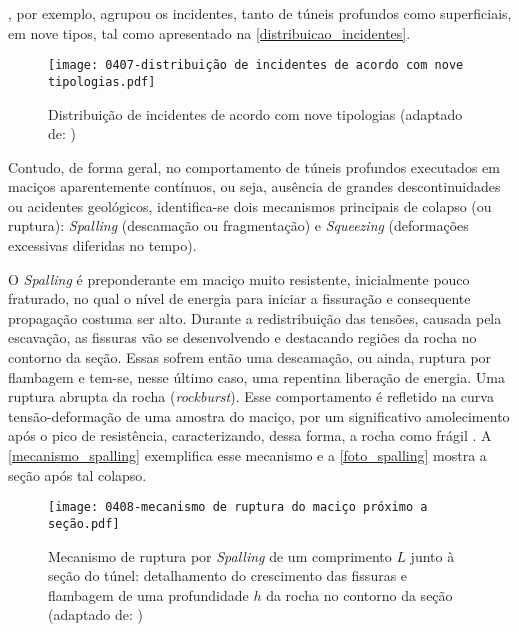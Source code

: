 , por exemplo, agrupou os incidentes, tanto de túneis profundos como superficiais, em nove tipos, tal como apresentado na \autoref{distribuicao_incidentes}.

\begin{figure}[H]
	\begin{center}
		\texttt{[image: 0407-distribuição de incidentes de acordo com nove tipologias.pdf]}
	\end{center}
	\caption{\label{distribuicao_incidentes}Distribuição de incidentes de acordo com nove tipologias (adaptado de: )}
\end{figure}

Contudo, de forma geral, no comportamento de túneis profundos executados em maciços aparentemente contínuos, ou seja, ausência de grandes descontinuidades ou acidentes geológicos, identifica-se dois mecanismos principais de colapso (ou ruptura): \textit{Spalling} (descamação ou fragmentação) e \textit{Squeezing} (deformações excessivas diferidas no tempo).

O \textit{Spalling} é preponderante em maciço muito resistente, inicialmente pouco fraturado, no qual o nível de energia para iniciar a fissuração e consequente propagação costuma ser alto. Durante a redistribuição das tensões, causada pela escavação, as fissuras vão se desenvolvendo e destacando regiões da rocha no contorno da seção. Essas sofrem então uma descamação, ou ainda, ruptura por flambagem e tem-se, nesse último caso, uma repentina liberação de energia. Uma ruptura abrupta da rocha (\textit{rockburst}). Esse comportamento é refletido na curva tensão-deformação de uma amostra do maciço, por um significativo amolecimento após o pico de resistência, caracterizando, dessa forma, a rocha como frágil \cite[p. 83]{Kleine2007}. A \autoref{mecanismo_spalling} exemplifica esse mecanismo e a \autoref{foto_spalling} mostra a seção após tal colapso.

\begin{figure}[H]
	\begin{center}
		\texttt{[image: 0408-mecanismo de ruptura do maciço próximo a seção.pdf]}
	\end{center}
	\caption{\label{mecanismo_spalling}Mecanismo de ruptura por \textit{Spalling} de um comprimento $L$ junto à seção do túnel: detalhamento do crescimento das fissuras e flambagem de uma profundidade $h$ da rocha no contorno da seção (adaptado de: )}
\end{figure}

